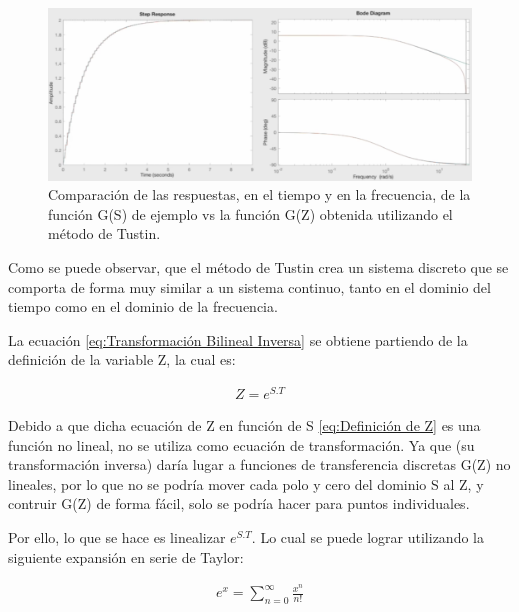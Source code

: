 \documentclass{article}
\begin{document}
\begin{sloppypar}
\begin{figure}[H]
    \centering
    \includegraphics[width=1\textwidth]{Comparación de las respuestas, en el tiempo y en la frecuencia, de la función G(S) de ejemplo vs la función G(Z) obtenida utilizando el método de Tustin}
    \caption{Comparación de las respuestas, en el tiempo y en la frecuencia, de la función G(S) de ejemplo vs la función G(Z) obtenida utilizando el método de Tustin.}
    \label{fig:Comparación de las respuestas, en el tiempo y en la frecuencia, de la función G(S) de ejemplo vs la función G(Z) obtenida utilizando el método de Tustin}
\end{figure}

Como se puede observar, que el método de Tustin crea un sistema discreto que se comporta de forma muy similar a un sistema continuo, tanto en el dominio del tiempo como en el dominio de la frecuencia.

La ecuación \ref{eq:Transformación Bilineal Inversa} se obtiene partiendo de la definición de la variable Z, la cual es:

\begin{align}   \label{eq:Definición de Z}
    Z=e^{S.T}
\end{align}

Debido a que dicha ecuación de Z en función de S \ref{eq:Definición de Z} es una función no lineal, no se utiliza como ecuación de transformación. Ya que (su transformación inversa) daría lugar a funciones de transferencia discretas G(Z) no lineales, por lo que no se podría mover cada polo y cero del dominio S al Z, y contruir G(Z) de forma fácil, solo se podría hacer para puntos individuales.

Por ello, lo que se hace es linealizar $e^{S.T}$. Lo cual se puede lograr utilizando la siguiente expansión en serie de Taylor:

\begin{align}   \label{eq:Expansión en Serie de Taylor para e^x}
    e^x=\sum_{n=0}^{\infty}\frac{x^n}{n!}
\end{align}


\end{sloppypar}
\end{document}
